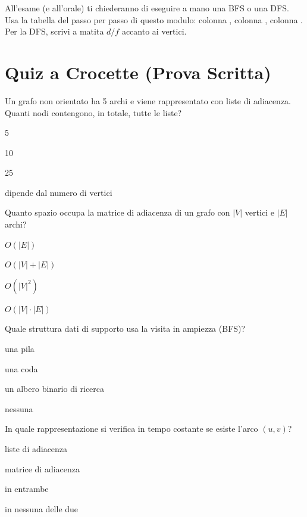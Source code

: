 \begin{consiglio}
All'esame (e all'orale) ti chiederanno di eseguire a mano una BFS o una DFS. Usa la
tabella del passo per passo di questo modulo: colonna , colonna
, colonna . Per la DFS, scrivi a matita $d/f$ accanto ai vertici.
\end{consiglio}

\section{Quiz a Crocette (Prova Scritta)}

\begin{quiz}{Un grafo non orientato ha 5 archi e viene rappresentato con liste di adiacenza. Quanti nodi contengono, in totale, tutte le liste?}
  \item 5
  \item 10
  \item 25
  \item dipende dal numero di vertici
\end{quiz}

\begin{quiz}{Quanto spazio occupa la matrice di adiacenza di un grafo con $|V|$ vertici e $|E|$ archi?}
  \item $O(|E|)$
  \item $O(|V| + |E|)$
  \item $O(|V|^2)$
  \item $O(|V| \cdot |E|)$
\end{quiz}

\begin{quiz}{Quale struttura dati di supporto usa la visita in ampiezza (BFS)?}
  \item una pila
  \item una coda
  \item un albero binario di ricerca
  \item nessuna
\end{quiz}

\begin{quiz}{In quale rappresentazione si verifica in tempo costante se esiste l'arco $(u,v)$?}
  \item liste di adiacenza
  \item matrice di adiacenza
  \item in entrambe
  \item in nessuna delle due
\end{quiz}

